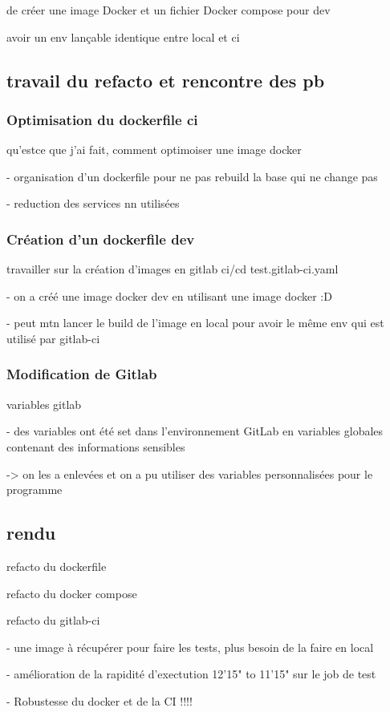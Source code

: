de créer une image Docker et un fichier Docker compose pour dev 

avoir un env lançable identique entre local et ci

\subsection{travail du refacto et rencontre des pb}
\subsubsection{Optimisation du dockerfile ci}
qu'estce que j'ai fait, comment optimoiser une image docker

-    organisation d'un dockerfile pour ne pas rebuild la base qui ne change pas

-    reduction des services nn utilisées

\subsubsection{Création d'un dockerfile dev}
travailler sur la création d'images en gitlab ci/cd test.gitlab-ci.yaml

-    on a créé une image docker dev en utilisant une image docker :D

- peut mtn lancer le build de l'image en local pour avoir le même env qui est utilisé par gitlab-ci

\subsubsection{Modification de Gitlab}
variables gitlab

- des variables ont été set dans l'environnement GitLab en variables globales contenant des informations sensibles

-> on les a enlevées et on a pu utiliser des variables personnalisées pour le programme

\subsection{rendu}
refacto du dockerfile

refacto du docker compose

refacto du gitlab-ci
    
- une image à récupérer pour faire les tests, plus besoin de la faire en local

- amélioration de la rapidité d'exectution 12'15" to 11'15" sur le job de test

- Robustesse du docker et de la CI !!!!
